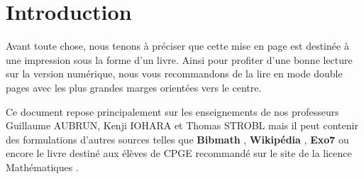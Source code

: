 \part{Introduction}

\def\arraystretch{1.5}
\par Avant toute chose, nous tenons à préciser que cette mise en page est destinée à une impression sous la forme d'un livre. Ainsi pour profiter d'une bonne lecture sur la version numérique, nous vous recommandons de la lire en mode \og double pages \fg avec les plus grandes marges orientées vers le centre. 
\\
\par \noindent Ce document repose principalement sur les enseignements de nos professeurs Guillaume AUBRUN, Kenji IOHARA et Thomas STROBL
mais il peut contenir des formulations d'autres sources telles que \textbf{Bibmath} \cite{bibmath}, \textbf{Wikipédia} \cite{wikipedia}, \textbf{Exo7} \cite{exo7} ou encore le livre destiné aux élèves de CPGE recommandé sur le site de la licence Mathématiques \cite{livre_prepa}.

